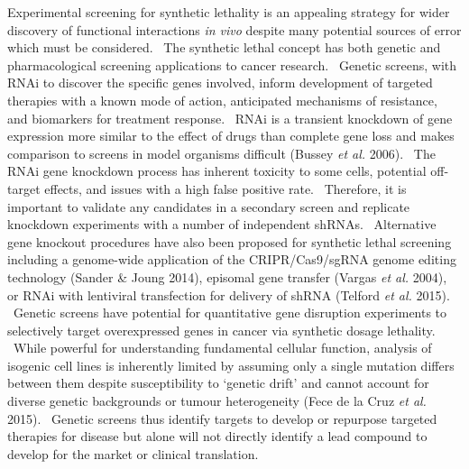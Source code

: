 Experimental screening for synthetic lethality is an appealing strategy
for wider discovery of functional interactions \textit{in vivo} despite
many potential sources of error which must be considered. \ The
synthetic lethal concept has both genetic and pharmacological screening
applications to cancer research. \ Genetic screens, with RNAi to
discover the specific genes involved, inform development of targeted
therapies with a known mode of action, anticipated mechanisms of
resistance, and biomarkers for treatment response. \ RNAi is a
transient knockdown of gene expression more similar to the effect of
drugs than complete gene loss and makes comparison to screens in model
organisms difficult (Bussey\textit{ et al.} 2006). \ The RNAi gene
knockdown process has inherent toxicity to some cells, potential
off-target effects, and issues with a high false positive rate.
\ Therefore, it is important to validate any candidates in a secondary
screen and replicate knockdown experiments with a number of independent
shRNAs. \ Alternative gene knockout procedures have also been proposed
for synthetic lethal screening including a genome-wide application of
the CRIPR/Cas9/sgRNA genome editing technology (Sander \& Joung 2014),
episomal gene transfer (Vargas\textit{ et al.} 2004), or RNAi with
lentiviral transfection for delivery of shRNA (Telford\textit{ et al.}
2015). \ Genetic screens have potential for quantitative gene
disruption experiments to selectively target overexpressed genes in
cancer via synthetic dosage lethality. \ While powerful for
understanding fundamental cellular function, analysis of isogenic cell
lines is inherently limited by assuming only a single mutation differs
between them despite susceptibility to {\textquoteleft}genetic
drift{\textquoteright} and cannot account for diverse genetic
backgrounds or tumour heterogeneity (Fece de la Cruz\textit{ et al.}
2015). \ Genetic screens thus identify targets to develop or repurpose
targeted therapies for disease but alone will not directly identify a
lead compound to develop for the market or clinical translation. \ 


